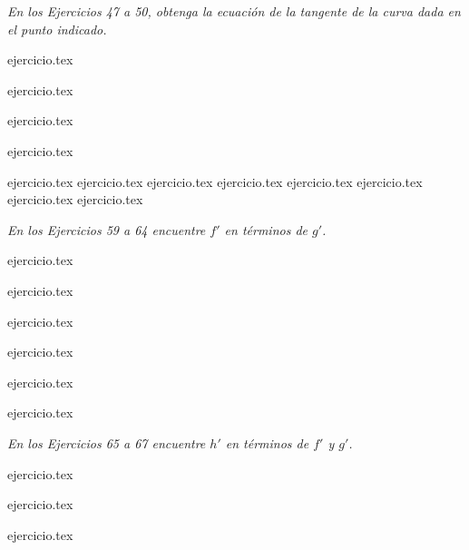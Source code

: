 \noindent \textit{En los Ejercicios 47 a 50, obtenga la ecuación de la tangente de la curva dada en el punto indicado.}

\begin{enumerate}
    \begin{minipage}{0.45\textwidth}
    \setcounter{enumi}{46}
    {ejercicio.tex}
    \addtocounter{enumi}{1}
    {ejercicio.tex}
    \end{minipage}%
    \begin{minipage}{0.45\textwidth}
    \setcounter{enumi}{47}
    {ejercicio.tex}
    \addtocounter{enumi}{1}
    {ejercicio.tex}
    \end{minipage}
\end{enumerate}

\begin{enumerate}
    {ejercicio.tex}
    {ejercicio.tex}
    {ejercicio.tex}
    {ejercicio.tex}
    {ejercicio.tex}
    {ejercicio.tex}
    {ejercicio.tex}
    {ejercicio.tex}
\end{enumerate}

\noindent \textit{En los Ejercicios 59 a 64 encuentre $f'$ en términos de $g'$.}

\begin{enumerate}
    \begin{minipage}{0.45\textwidth}
    \setcounter{enumi}{58}
    {ejercicio.tex}
    \addtocounter{enumi}{1}
    {ejercicio.tex}
    \addtocounter{enumi}{1}
    {ejercicio.tex}
    \end{minipage}%
    \begin{minipage}{0.45\textwidth}
    \setcounter{enumi}{59}
    {ejercicio.tex}
    \addtocounter{enumi}{1}
    {ejercicio.tex}
    \addtocounter{enumi}{1}
    {ejercicio.tex}
    \end{minipage}
\end{enumerate}

\noindent \textit{En los Ejercicios 65 a 67 encuentre $h'$ en términos de $f'$ y $g'$.}

\begin{enumerate}
    \begin{minipage}{0.45\textwidth}
    \setcounter{enumi}{64}
    {ejercicio.tex}
    \addtocounter{enumi}{1}
    {ejercicio.tex}
    \end{minipage}%
    \begin{minipage}{0.45\textwidth}
    \setcounter{enumi}{65}
    {ejercicio.tex}
    \end{minipage}
\end{enumerate}

